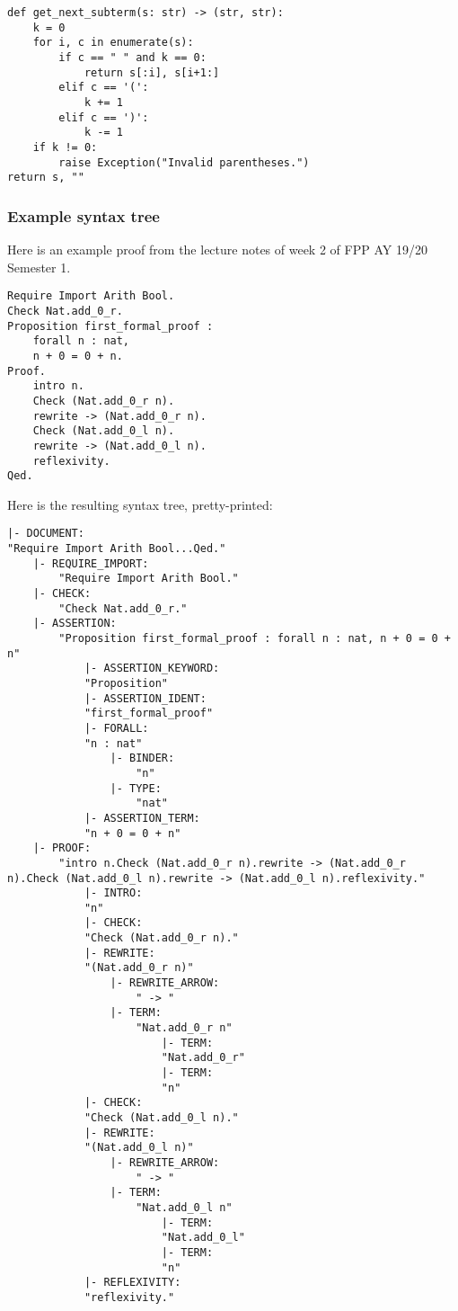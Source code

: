 \begin{verbatim}
def get_next_subterm(s: str) -> (str, str):
    k = 0
    for i, c in enumerate(s):
        if c == " " and k == 0:
            return s[:i], s[i+1:]
        elif c == '(':
            k += 1
        elif c == ')':
            k -= 1
    if k != 0:
        raise Exception("Invalid parentheses.")
return s, ""
\end{verbatim}

\subsubsection{Example syntax tree}
Here is an example proof from the lecture notes of week 2 of FPP AY 19/20 Semester 1.
\begin{verbatim}
Require Import Arith Bool.
Check Nat.add_0_r.
Proposition first_formal_proof :
    forall n : nat,
    n + 0 = 0 + n.
Proof.
    intro n.
    Check (Nat.add_0_r n).
    rewrite -> (Nat.add_0_r n).
    Check (Nat.add_0_l n).
    rewrite -> (Nat.add_0_l n).
    reflexivity.
Qed.
\end{verbatim}
Here is the resulting syntax tree, pretty-printed:
\begin{verbatim}
|- DOCUMENT:
"Require Import Arith Bool...Qed."
    |- REQUIRE_IMPORT:
        "Require Import Arith Bool."
    |- CHECK:
        "Check Nat.add_0_r."
    |- ASSERTION:
        "Proposition first_formal_proof : forall n : nat, n + 0 = 0 + n"
            |- ASSERTION_KEYWORD:
            "Proposition"
            |- ASSERTION_IDENT:
            "first_formal_proof"
            |- FORALL:
            "n : nat"
                |- BINDER:
                    "n"
                |- TYPE:
                    "nat"
            |- ASSERTION_TERM:
            "n + 0 = 0 + n"
    |- PROOF:
        "intro n.Check (Nat.add_0_r n).rewrite -> (Nat.add_0_r n).Check (Nat.add_0_l n).rewrite -> (Nat.add_0_l n).reflexivity."
            |- INTRO:
            "n"
            |- CHECK:
            "Check (Nat.add_0_r n)."
            |- REWRITE:
            "(Nat.add_0_r n)"
                |- REWRITE_ARROW:
                    " -> "
                |- TERM:
                    "Nat.add_0_r n"
                        |- TERM:
                        "Nat.add_0_r"
                        |- TERM:
                        "n"
            |- CHECK:
            "Check (Nat.add_0_l n)."
            |- REWRITE:
            "(Nat.add_0_l n)"
                |- REWRITE_ARROW:
                    " -> "
                |- TERM:
                    "Nat.add_0_l n"
                        |- TERM:
                        "Nat.add_0_l"
                        |- TERM:
                        "n"
            |- REFLEXIVITY:
            "reflexivity."
\end{verbatim}
